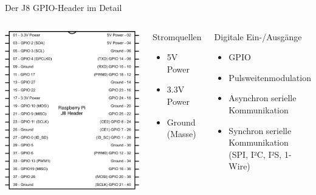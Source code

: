 {
\footnotesize

\begin{frame}{Der J8 GPIO-Header im Detail}
        \begin{columns}
            \includegraphics[width=\textwidth]{2-hardwaredesign/img/raspberry_j8}

            \begin{block}{Stromquellen}
                \begin{itemize}
                    \item 5V Power
                    \item 3.3V Power
                    \item Ground (Masse)
                \end{itemize}
            \end{block}

            \begin{block}{Digitale Ein-/Ausgänge}
                \begin{itemize}
                    \item GPIO
                    \item Pulsweitenmodulation
                    \item Asynchron serielle Kommunikation
                    \item Synchron serielle Kommunikation \\ (SPI, I²C, I²S, 1-Wire)
                \end{itemize}
            \end{block}


\end{columns}
\end{frame}}
